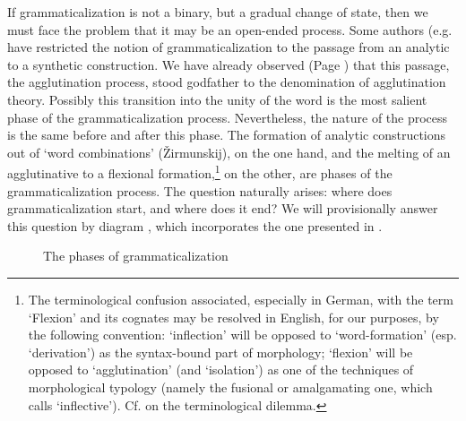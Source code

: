 If grammaticalization is not a binary, but a gradual change of state, then we must face the problem that it may be an open-ended process. Some authors (e.g. \citet[113--115]{Ronneberger-Sibold1980} have restricted the notion of grammaticalization to the passage from an analytic to a synthetic construction. We have already observed (Page \pageref{Agglutinationstheorie}) that this passage, the agglutination process, stood godfather to the denomination of agglutination theory. Possibly this transition into the unity of the word is the most salient phase of the grammaticalization process. Nevertheless, the nature of the process is the same before and after this phase. The formation of analytic constructions out of ‘word combinations’ (Žirmunskij), on the one hand, and the melting  of an agglutinative to a flexional formation,\footnote{The terminological confusion associated, especially in German, with the term ‘Flexion’ and its cognates may be resolved in English, for our purposes, by the following convention: ‘inflection’ will be opposed to ‘word-formation’ (esp. ‘derivation’) as the syntax-bound part of morphology; ‘flexion’ will be opposed to ‘agglutination’ (and ‘isolation’) as one of the techniques of morphological typology (namely the fusional or amalgamating one, which \citet[129ff]{Sapir1921} calls ‘inflective’). Cf. \citet[41f]{Comrie1981b} on the terminological dilemma.} on the other, are phases of the grammaticalization process. The question naturally arises: where does grammaticalization start, and where does it end? We will provisionally answer this question by diagram , which incorporates the one presented in \citet[209]{Givón1979b}.


\begin{figure}
\caption{The phases of grammaticalization} \label{fig:phases}
\end{figure}


